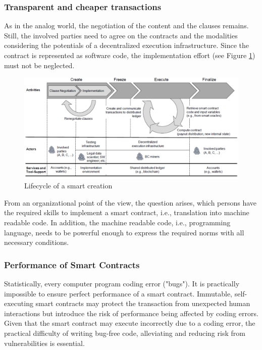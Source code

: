 \subsubsection{Transparent and cheaper transactions}
As in the analog world, the negotiation of the
content and the clauses remains. Still, the involved parties need to agree on the contracts and
the modalities considering the potentials of a decentralized execution infrastructure.
Since the contract is represented as software code, the implementation effort (see Figure \ref{fig:smartcontractcreation})
must not be neglected.
\begin{figure}[H]
	\centering
	\includegraphics[width=1\linewidth]{Images/smartContractCreation}
	\caption{Lifecycle of a smart creation \cite{Sillaber2017}}
	\label{fig:smartcontractcreation}
\end{figure}

 From an organizational point of the view, the question arises, which
persons have the required skills to implement
a smart contract, i.e., translation into machine readable code. In addition, the machine readable
code, i.e., programming language, needs to be powerful enough to express the required norms
with all necessary conditions.


\subsubsection{Performance of Smart Contracts}
Statistically, every computer program coding error ("bugs"). It is practically impossible to ensure perfect performance of a smart contract. Immutable, self-executing smart contracts may protect  
the transaction from unexpected human interactions but introduce the risk of
performance being affected by coding errors. Given that the smart contract may execute incorrectly due to a coding error, the practical difficulty of writing bug-free code, alleviating and reducing risk from vulnerabilities is essential.



